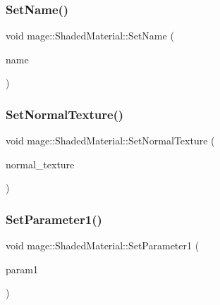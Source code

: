 \hypertarget{structmage_1_1_shaded_material_aa2a120f4df21d5fbde733ce12a348571}{}\label{structmage_1_1_shaded_material_aa2a120f4df21d5fbde733ce12a348571} 
\subsubsection{\texorpdfstring{Set\+Name()}{SetName()}\hspace{0.1cm}{\footnotesize\ttfamily [2/2]}}
{\footnotesize\ttfamily void mage\+::\+Shaded\+Material\+::\+Set\+Name (\begin{DoxyParamCaption}\item[{string \&\&}]{name }\end{DoxyParamCaption})}

\hypertarget{structmage_1_1_shaded_material_a681531e5a979ebdc4a0e8933a2439c0f}{}\label{structmage_1_1_shaded_material_a681531e5a979ebdc4a0e8933a2439c0f} 
\subsubsection{\texorpdfstring{Set\+Normal\+Texture()}{SetNormalTexture()}}
{\footnotesize\ttfamily void mage\+::\+Shaded\+Material\+::\+Set\+Normal\+Texture (\begin{DoxyParamCaption}\item[{\hyperlink{namespacemage_a1e01ae66713838a7a67d30e44c67703e}{Shared\+Ptr}$<$ \hyperlink{classmage_1_1_texture}{Texture} $>$}]{normal\+\_\+texture }\end{DoxyParamCaption})}

\hypertarget{structmage_1_1_shaded_material_a16cc73293d4e18f3945e4a5818041ea7}{}\label{structmage_1_1_shaded_material_a16cc73293d4e18f3945e4a5818041ea7} 
\subsubsection{\texorpdfstring{Set\+Parameter1()}{SetParameter1()}}
{\footnotesize\ttfamily void mage\+::\+Shaded\+Material\+::\+Set\+Parameter1 (\begin{DoxyParamCaption}\item[{float}]{param1 }\end{DoxyParamCaption})\hspace{0.3cm}{\ttfamily [noexcept]}}

